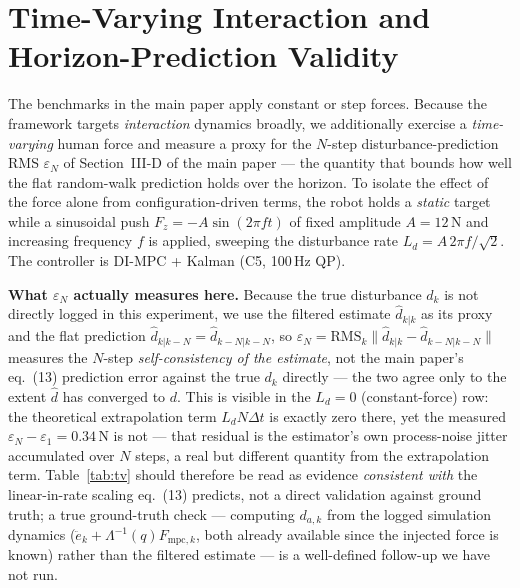 \documentclass[journal]{IEEEtran}
\newcommand{\Laminv}{\Lambda^{-1}(q)}
\newcommand{\Fmpck}[1]{F_{\text{mpc},#1}}
\newcommand{\dhat}{\hat{d}}
\begin{document}
\section{Time-Varying Interaction and Horizon-Prediction Validity}\label{sec:tv}

The benchmarks in the main paper apply constant or step forces. Because
the framework targets \emph{interaction} dynamics broadly, we
additionally exercise a \emph{time-varying} human force and measure a
proxy for the $N$-step disturbance-prediction RMS $\varepsilon_N$ of
Section~III-D of the main paper --- the quantity that bounds how well the
flat random-walk prediction holds over the horizon. To isolate the
effect of the force alone from configuration-driven terms, the robot
holds a \emph{static} target while a sinusoidal push
$F_z=-A\sin(2\pi ft)$ of fixed amplitude $A=12$\,N and increasing
frequency $f$ is applied, sweeping the disturbance rate
$L_d=A\,2\pi f/\sqrt2$. The controller is DI-MPC + Kalman (C5, 100\,Hz
QP).

\textbf{What $\varepsilon_N$ actually measures here.} Because the true
disturbance $d_k$ is not directly logged in this experiment, we use the
filtered estimate $\dhat_{k|k}$ as its proxy and the flat prediction
$\dhat_{k|k-N}=\dhat_{k-N|k-N}$, so
$\varepsilon_N=\mathrm{RMS}_k\|\dhat_{k|k}-\dhat_{k-N|k-N}\|$ measures
the $N$-step \emph{self-consistency of the estimate}, not the main
paper's eq.~(13) prediction error against the true $d_k$ directly ---
the two agree only to the extent $\dhat$ has converged to $d$. This is
visible in the $L_d=0$ (constant-force) row: the theoretical
extrapolation term $L_dN\Delta t$ is exactly zero there, yet the
measured $\varepsilon_N-\varepsilon_1=0.34$\,N is not --- that residual
is the estimator's own process-noise jitter accumulated over $N$ steps,
a real but different quantity from the extrapolation term. Table~\ref{tab:tv}
should therefore be read as evidence \emph{consistent with} the
linear-in-rate scaling eq.~(13) predicts, not a direct validation
against ground truth; a true ground-truth check --- computing $d_{a,k}$
from the logged simulation dynamics ($\ddot e_k+\Laminv\Fmpck{k}$, both
already available since the injected force is known) rather than the
filtered estimate --- is a well-defined follow-up we have not run.
\end{document}
